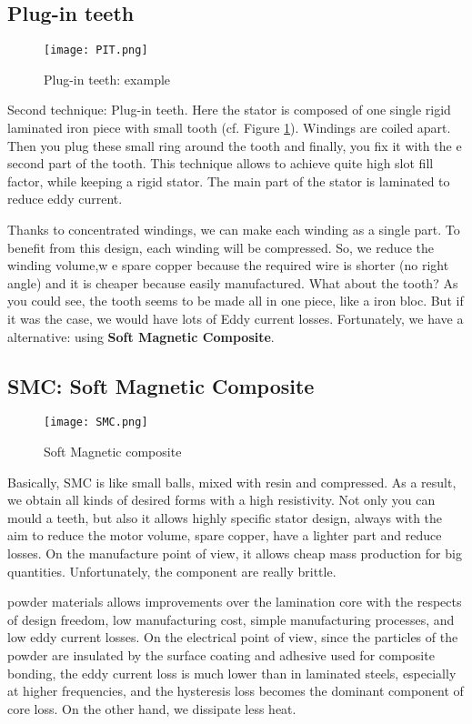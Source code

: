 \subsection{Plug-in teeth}

\begin{figure}[H]
    \centering
    \texttt{[image: PIT.png]}
    \caption{Plug-in teeth: example}
    \label{fig:PIT}
\end{figure}

Second technique: Plug-in teeth. Here the stator is composed of one single rigid laminated iron piece with small tooth (cf. Figure \ref{fig:PIT}). Windings are coiled apart. Then you plug these small ring around the tooth and finally, you fix it with the e second part of the tooth. 
This technique allows to achieve quite high slot fill factor, while keeping a rigid stator.
The main part of the stator is laminated to reduce eddy current.

Thanks to concentrated windings, we can make each winding as a single part. To benefit from this design, each winding will be compressed. So, we reduce the winding volume,w e spare copper because the required wire is shorter (no right angle) and it is cheaper because easily manufactured. What about the tooth? As you could see, the tooth seems to be made all in one piece, like a iron bloc. But if it was the case, we would have lots of Eddy current losses. Fortunately, we have a alternative: using \textbf{Soft Magnetic Composite}.

\subsection{SMC: Soft Magnetic Composite}

\begin{figure}[H]
    \centering
    \texttt{[image: SMC.png]}
    \caption{Soft Magnetic composite}
    \label{fig:SMC}
\end{figure}

Basically, SMC is like small balls, mixed with resin and compressed. As a result, we obtain all kinds of desired forms with a high resistivity. Not only you can mould a teeth, but also it allows highly specific stator design, always with the aim to reduce the motor volume, spare copper, have a lighter part and reduce losses. On the manufacture point of view, it allows cheap mass production for big quantities. Unfortunately, the component are really brittle.

powder materials allows improvements over the lamination core with the respects of design freedom, low manufacturing cost, simple manufacturing processes, and low eddy current losses. 
On the electrical point of view, since the particles of the powder are insulated by the surface coating and adhesive used for composite bonding, the eddy current loss is much lower than in laminated steels, especially at higher frequencies, and the hysteresis loss becomes the dominant component of core loss. 
On the other hand, we dissipate less heat.


